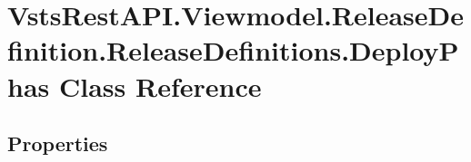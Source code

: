 \hypertarget{class_vsts_rest_a_p_i_1_1_viewmodel_1_1_release_definition_1_1_release_definitions_1_1_deploy_phas}{}\section{Vsts\+Rest\+A\+P\+I.\+Viewmodel.\+Release\+Definition.\+Release\+Definitions.\+Deploy\+Phas Class Reference}
\label{class_vsts_rest_a_p_i_1_1_viewmodel_1_1_release_definition_1_1_release_definitions_1_1_deploy_phas}
\subsection*{Properties}
